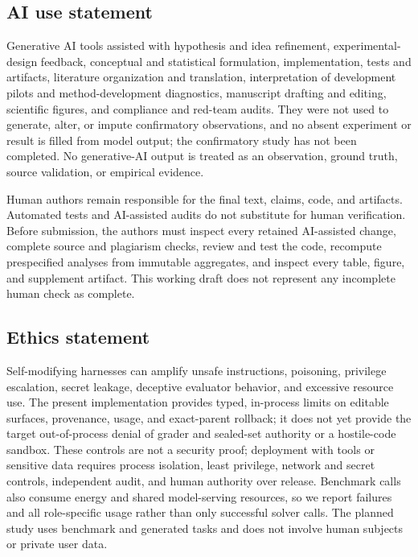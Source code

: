\subsection*{AI use statement}

Generative AI tools assisted with hypothesis and idea refinement,
experimental-design feedback, conceptual and statistical formulation,
implementation, tests and artifacts, literature organization and translation,
interpretation of development pilots and method-development diagnostics,
manuscript drafting and editing, scientific figures, and compliance and
red-team audits.  They were not used to generate, alter, or impute confirmatory
observations, and no absent experiment or result is filled from model output;
the confirmatory study has not been completed.  No generative-AI output is
treated as an observation, ground truth, source validation, or empirical
evidence.

Human authors remain responsible for the final text, claims, code, and
artifacts.  Automated tests and AI-assisted audits do not substitute for human
verification.  Before submission, the authors must inspect every retained
AI-assisted change, complete source and plagiarism checks, review and test the
code, recompute prespecified analyses from immutable aggregates, and inspect
every table, figure, and supplement artifact.  This working draft does not
represent any incomplete human check as complete.

\subsection*{Ethics statement}

Self-modifying harnesses can amplify unsafe instructions, poisoning, privilege
escalation, secret leakage, deceptive evaluator behavior, and excessive
resource use.  The present implementation provides typed, in-process limits on
editable surfaces, provenance, usage, and exact-parent rollback; it does not yet
provide the target out-of-process denial of grader and sealed-set authority or a
hostile-code sandbox.  These controls are not a security proof; deployment with tools or sensitive data requires process
isolation, least privilege, network and secret controls, independent audit, and
human authority over release.  Benchmark calls also consume energy and shared
model-serving resources, so we report failures and all role-specific usage
rather than only successful solver calls.  The planned study uses benchmark
and generated tasks and does not involve human subjects or private user data.

